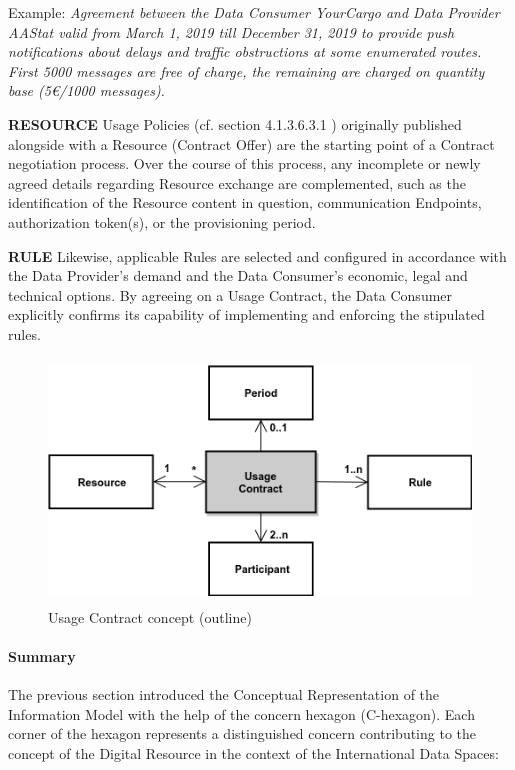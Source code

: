 Example: \textit{Agreement between the Data Consumer YourCargo and Data Provider AAStat valid from March 1, 2019 till December 31, 2019 to provide push notifications about delays and traffic obstructions at some enumerated routes. First 5000 messages are free of charge, the remaining are charged on quantity base (5€/1000 messages).}

\textbf{RESOURCE} Usage Policies (cf. section 4.1.3.6.3.1%
) originally published alongside with a Resource (Contract Offer) are the starting point of a Contract negotiation process. Over the course of this process, any incomplete or newly agreed details regarding Resource exchange are complemented, such as the identification of the Resource content in question, communication Endpoints, authorization token(s), or the provisioning period. 

\textbf{RULE} Likewise, applicable Rules are selected and configured in accordance with the Data Provider’s demand and the Data Consumer’s economic, legal and technical options. By agreeing on a Usage Contract, the Data Consumer explicitly confirms its capability of implementing and enforcing the stipulated rules.




\begin{figure}[H]
	\begin{Center}
		\includegraphics[width=4.67in,height=2.55in]{./media/image52.png}
		\caption{Usage Contract concept (outline)}
		\label{fig:Usage_Contract_concept_outline}
	\end{Center}
\end{figure}



\paragraph{Summary\\}
The previous section introduced the Conceptual Representation of the Information Model with the help of the concern hexagon (C-hexagon). Each corner of the hexagon represents a distinguished concern contributing to the concept of the Digital Resource in the context of the International Data Spaces: 

